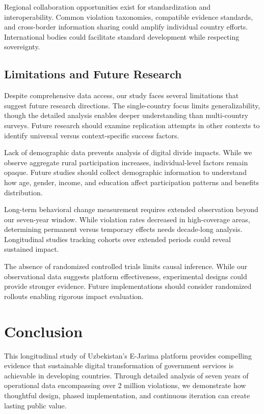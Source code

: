 \documentclass[pdflatex,sn-mathphys-num]{sn-jnl}%
\theoremstyle{thmstyleone}%
\theoremstyle{thmstyletwo}%
\theoremstyle{thmstylethree}%
\begin{document}
Regional collaboration opportunities exist for standardization and interoperability. Common violation taxonomies, compatible evidence standards, and cross-border information sharing could amplify individual country efforts. International bodies could facilitate standard development while respecting sovereignty.

\subsection{Limitations and Future Research}\label{subsec22}

Despite comprehensive data access, our study faces several limitations that suggest future research directions. The single-country focus limits generalizability, though the detailed analysis enables deeper understanding than multi-country surveys. Future research should examine replication attempts in other contexts to identify universal versus context-specific success factors.

Lack of demographic data prevents analysis of digital divide impacts. While we observe aggregate rural participation increases, individual-level factors remain opaque. Future studies should collect demographic information to understand how age, gender, income, and education affect participation patterns and benefits distribution.

Long-term behavioral change measurement requires extended observation beyond our seven-year window. While violation rates decreased in high-coverage areas, determining permanent versus temporary effects needs decade-long analysis. Longitudinal studies tracking cohorts over extended periods could reveal sustained impact.

The absence of randomized controlled trials limits causal inference. While our observational data suggests platform effectiveness, experimental designs could provide stronger evidence. Future implementations should consider randomized rollouts enabling rigorous impact evaluation.

\section{Conclusion}\label{sec7}

This longitudinal study of Uzbekistan's E-Jarima platform provides compelling evidence that sustainable digital transformation of government services is achievable in developing countries. Through detailed analysis of seven years of operational data encompassing over 2 million violations, we demonstrate how thoughtful design, phased implementation, and continuous iteration can create lasting public value.
\end{document}
